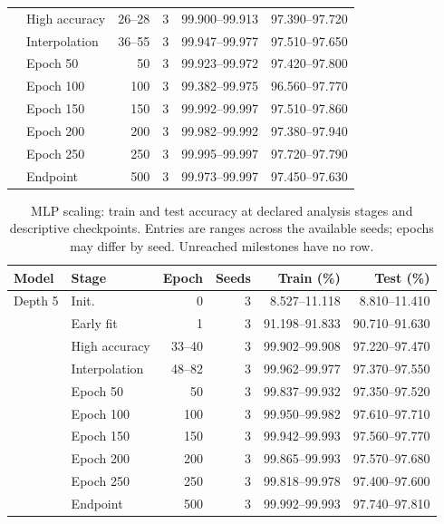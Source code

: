 \begin{table}[!htbp]
\begin{tabular}{llrrrr}
 & High accuracy & 26--28 & 3 & 99.900--99.913 & 97.390--97.720\\
 & Interpolation & 36--55 & 3 & 99.947--99.977 & 97.510--97.650\\
 & Epoch 50 & 50 & 3 & 99.923--99.972 & 97.420--97.800\\
 & Epoch 100 & 100 & 3 & 99.382--99.975 & 96.560--97.770\\
 & Epoch 150 & 150 & 3 & 99.992--99.997 & 97.510--97.860\\
 & Epoch 200 & 200 & 3 & 99.982--99.992 & 97.380--97.940\\
 & Epoch 250 & 250 & 3 & 99.995--99.997 & 97.720--97.790\\
 & Endpoint & 500 & 3 & 99.973--99.997 & 97.450--97.630\\
\bottomrule\end{tabular}\end{table}

\FloatBarrier
\begin{table}[!htbp]\centering
\caption{MLP scaling: train and test accuracy at declared analysis stages and descriptive checkpoints. Entries are ranges across the available seeds; epochs may differ by seed. Unreached milestones have no row.}\label{tab:perf-1-6}
\small\setlength{\tabcolsep}{4pt}
\begin{tabular}{llrrrr}\toprule
Model & Stage & Epoch & Seeds & Train (\%) & Test (\%)\\\midrule
Depth 5 & Init. & 0 & 3 & 8.527--11.118 & 8.810--11.410\\
 & Early fit & 1 & 3 & 91.198--91.833 & 90.710--91.630\\
 & High accuracy & 33--40 & 3 & 99.902--99.908 & 97.220--97.470\\
 & Interpolation & 48--82 & 3 & 99.962--99.977 & 97.370--97.550\\
 & Epoch 50 & 50 & 3 & 99.837--99.932 & 97.350--97.520\\
 & Epoch 100 & 100 & 3 & 99.950--99.982 & 97.610--97.710\\
 & Epoch 150 & 150 & 3 & 99.942--99.993 & 97.560--97.770\\
 & Epoch 200 & 200 & 3 & 99.865--99.993 & 97.570--97.680\\
 & Epoch 250 & 250 & 3 & 99.818--99.978 & 97.400--97.600\\
 & Endpoint & 500 & 3 & 99.992--99.993 & 97.740--97.810\\
\bottomrule\end{tabular}\end{table}

